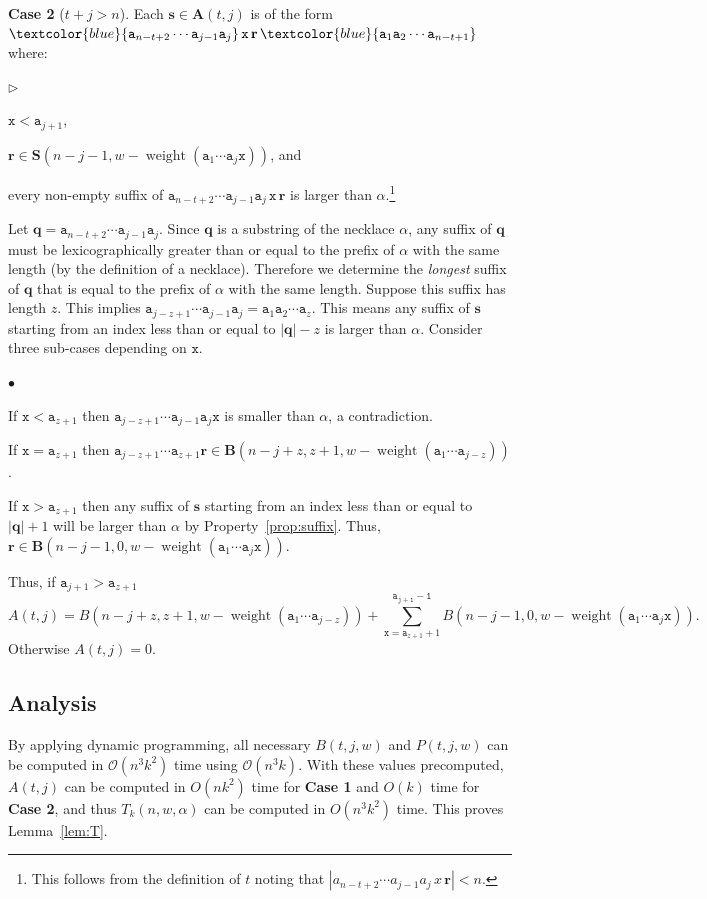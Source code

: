 \documentclass[US-letter,USenglish,authorcolumns,autoref]{lipics-v2021}
\renewcommand{\tt} {\mathtt}
\newcommand{\squishlist}{
 \begin{list}{$\bullet$}
  { \setlength{\itemsep}{0pt}
     \setlength{\parsep}{3pt}
     \setlength{\topsep}{3pt}
     \setlength{\partopsep}{0pt}
     \setlength{\leftmargin}{2.5em}
     \setlength{\labelwidth}{1em}
     \setlength{\labelsep}{0.5em} } }
\newcommand{\squishlisttwo}{
 \begin{list}{$\triangleright$}
  { \setlength{\itemsep}{0pt}
     \setlength{\parsep}{0pt}
    \setlength{\topsep}{0pt}
    \setlength{\partopsep}{0pt}
    \setlength{\leftmargin}{2em}
    \setlength{\labelwidth}{1.5em}
    \setlength{\labelsep}{0.5em} } }
\newcommand{\squishend}{
  \end{list}  }
\newcommand{\bS}{\mathbf{S}}
\newcommand{\bs}{\mathbf{s}}
\newcommand{\br}{\mathbf{r}}
\newcommand{\bq}{\mathbf{q}}
\newcommand{\blue}[1] {\textcolor{blue}{#1}}
\DeclareMathOperator{\wt}{weight}
\begin{document}
\noindent
{\bf Case 2} ($t+j > n$).  Each $\bs \in \mathbf{A}(t,j)$ is of the form
$\blue{\tt{a}_{n-t+2}\cdots \tt{a}_{j-1}\tt{a}_{j}}\,\tt{x}\,\br\,\blue{\tt{a}_1\tt{a}_2\cdots \tt{a}_{n-t+1}}$ where:
\squishlisttwo
\item $\tt{x} < \tt{a}_{j+1}$,
\item $\br \in \bS(n-j-1, w-\wt(\tt{a}_1\cdots \tt{a}_j\tt{x}))$, and 
\item every non-empty suffix of $\tt{a}_{n-t+2}\cdots \tt{a}_{j-1}\tt{a}_{j}\,\tt{x}\,\br$ is larger than $\alpha$.\footnote{This follows from the definition of $t$ noting that $|a_{n-t+2}\cdots a_{j-1}a_{j}\,x\,\br| < n$.}
\squishend
%
Let $\bq = \tt{a}_{n-t+2}\cdots \tt{a}_{j-1}\tt{a}_{j}$.  Since  $\bq$ is a substring of the necklace $\alpha$,  any suffix of $\bq$ must be lexicographically greater than or equal to the prefix of $\alpha$ with the same length (by the definition of a necklace).  
Therefore we determine the \emph{longest} suffix of $\bq$ that is equal to the prefix of $\alpha$ with the same length.  Suppose this suffix has length $z$.  This
 implies $\tt{a}_{j-z+1}\cdots \tt{a}_{j-1}\tt{a}_{j} = \tt{a}_1\tt{a}_2\cdots \tt{a}_z$.  This means any suffix of $\bs$ starting from an index less than or equal to $|
\bq|-z$ is larger than $\alpha$.  Consider three sub-cases depending on $\tt{x}$.
%
\squishlist
\item If $\tt{x} < \tt{a}_{z+1}$ then $\tt{a}_{j-z+1}\cdots \tt{a}_{j-1}\tt{a}_{j}\tt{x}$ is smaller than $\alpha$, a contradiction.  
\item If $\tt{x} = \tt{a}_{z+1}$ then $\tt{a}_{j-z+1}\cdots \tt{a}_{z+1}\br \in \mathbf{B}(n-j+z, z+1, w-\wt(\tt{a}_1\cdots \tt{a}_{j-z}))$.
 \item If $\tt{x} > \tt{a}_{z+1}$ then any suffix of $\bs$ starting from an index less than or equal to $|\bq|+1$ will be larger than $\alpha$ by Property~\ref{prop:suffix}.  Thus, 
$\br \in \mathbf{B}(n-j-1,0,w-\wt(\tt{a}_1\cdots \tt{a}_j\tt{x}))$.   
 \squishend
Thus, if $\tt{a}_{j+1} > \tt{a}_{z+1}$
%
\[ A(t,j)  = B(n-j+z, z+1, w-\wt(\tt{a}_1\cdots \tt{a}_{j-z})) + 
\sum_{\tt{x} = \tt{a}_{z+1}+1}^\tt{a_{j+1}-1} B(n-j-1,0,w-\wt(\tt{a}_1\cdots \tt{a}_j\tt{x}) ). \]
%
Otherwise $A(t,j) = 0$.

\subsection{Analysis}

By applying dynamic programming, all necessary $B(t,j,w)$ and $P(t,j,w)$ can be computed in $\mathcal{O}(n^3k^2)$ time using $\mathcal{O}(n^3k)$.  With these values precomputed,
    $A(t,j)$ can be computed in $O(nk^2)$ time for {\bf Case 1} and $O(k)$ time for {\bf Case 2}, and thus
    $T_k(n,w,\alpha)$ can be computed in $O(n^3k^2)$ time.
%
\noindent
This proves Lemma~\ref{lem:T}.
\end{document}
